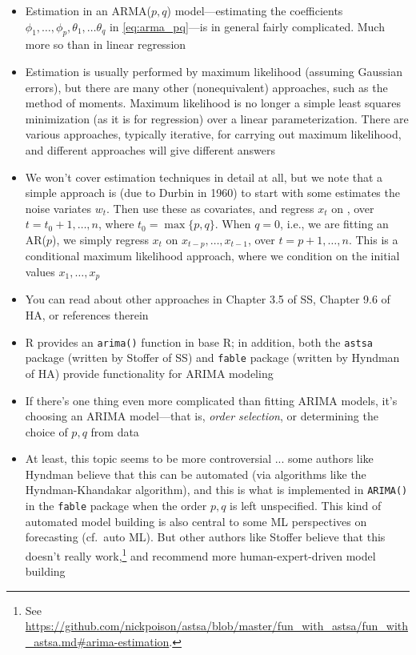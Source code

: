 \documentclass{article}
\begin{document}
\begin{itemize}
\item Estimation in an ARMA($p,q$) model---estimating the coefficients
  $\phi_1,\dots,\phi_p,\theta_1,\dots\theta_q$ in \eqref{eq:arma_pq}---is in 
  general fairly complicated. Much more so than in linear regression 

\item Estimation is usually performed by maximum likelihood (assuming Gaussian
  errors), but there are many other (nonequivalent) approaches, such as the
  method of moments. Maximum likelihood is no longer a simple least squares 
  minimization (as it is for regression) over a linear parameterization. There
  are various approaches, typically iterative, for carrying out maximum
  likelihood, and different approaches will give different answers     

\item We won't cover estimation techniques in detail at all, but we note that a
  simple approach is (due to Durbin in 1960) to start with some estimates
   the noise variates $w_t$. Then use these as covariates, 
  and regress $x_t$ on
  , over $t =
  t_0+1,\dots,n$, where $t_0 = \max\{p,q\}$. When $q = 0$, i.e., we are fitting
  an AR($p$), we simply regress $x_t$ on $x_{t-p},\dots,x_{t-1}$, over $t = 
  p+1,\dots,n$. This is a conditional maximum likelihood approach, where we 
  condition on the initial values $x_1,\dots,x_p$   

\item You can read about other approaches in Chapter 3.5 of SS, Chapter 9.6 of
  HA, or references therein  

\item R provides an \verb|arima()| function in base R; in addition, both the
  \verb|astsa| package (written by Stoffer of SS) and \verb|fable| package
  (written by Hyndman of HA) provide functionality for ARIMA modeling

\item If there's one thing even more complicated than fitting ARIMA models, it's
  choosing an ARIMA model---that is, \emph{order selection}, or determining the 
  choice of $p,q$ from data 

\item At least, this topic seems to be more controversial ... some authors like
  Hyndman believe that this can be automated (via algorithms like the
  Hyndman-Khandakar algorithm), and this is what is implemented in
  \verb|ARIMA()| in the \verb|fable| package when the order $p,q$ is left 
  unspecified. This kind of automated model building is also central to some ML 
  perspectives on forecasting (cf.\ auto ML). But other authors like Stoffer
  believe that this doesn't really work,\footnote{See
    \url{https://github.com/nickpoison/astsa/blob/master/fun_with_astsa/fun_with_astsa.md\#arima-estimation}.}  
  and recommend more human-expert-driven model building  


\end{itemize}
\end{document}
